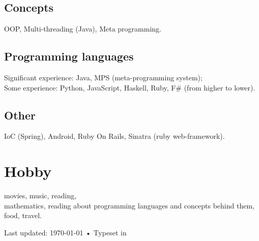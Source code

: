 \documentclass[11pt, a4paper]{article}
\begin{document}
\subsection*{Concepts}
OOP, Multi-threading (Java), Meta programming.

\subsection*{Programming languages}
Significant experience: Java, MPS (meta-programming system); \\
Some experience: Python, JavaScript, Haskell, Ruby, F\# (from higher to lower).

\subsection*{Other}
IoC (Spring), Android, Ruby On Rails, Sinatra (ruby web-framework). \\[.2cm]

\section*{Hobby}

movies, music, reading, \\
mathematics, reading about programming languages and concepts behind them, \\
food, travel. \\



\vfill{}

\begin{center}
{\scriptsize  Last updated: \today\- •\- 
Typeset in \href{http://nitens.org/taraborelli/cvtex}{
\XeTeX }\\
}
\end{center}
\end{document}
